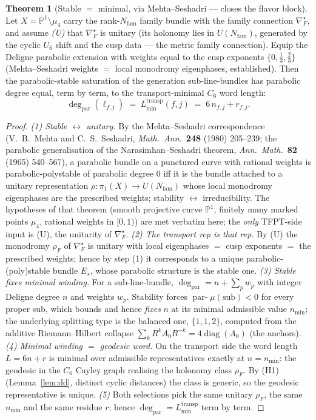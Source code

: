 \documentclass[11pt,a4paper]{article}
\newcommand{\Nfam}{N_{\mathrm{fam}}}
\theoremstyle{definition}
\newtheorem{theorem}{Theorem}
\begin{document}
\begin{theorem}[Stable $=$ minimal, via Mehta--Seshadri --- closes the flavor block]
\label{thm:ms}
Let $X=\mathbb P^1\setminus\mu_4$ carry the rank-$\Nfam$ family bundle with the family
connection $\nabla_F^\star$, and assume \emph{(U)} that $\nabla_F^\star$ is unitary (its holonomy lies in
$U(\Nfam)$, generated by the cyclic $U_6$ shift and the cusp data --- the metric family connection).
Equip the Deligne parabolic extension with weights equal to the cusp exponents
$\{0,\tfrac13,\tfrac23\}$ (Mehta--Seshadri weights $=$ local monodromy eigenphases, established).
Then the parabolic-stable saturation of the generation sub-line-bundles has parabolic degree equal,
term by term, to the transport-minimal $C_6$ word length:
\[
  \deg_{\mathrm{par}}(\ell_{f,j}) \;=\; L^{\mathrm{transp}}_{\min}(f,j)\;=\;6\,n_{f,j}+r_{f,j}.
\]
\end{theorem}
\begin{proof}
\emph{(1) Stable $\leftrightarrow$ unitary.} By the Mehta--Seshadri correspondence (V.~B.~Mehta and
C.~S.~Seshadri, \emph{Math.\ Ann.}\ \textbf{248} (1980) 205--239; the parabolic generalisation of the
Narasimhan--Seshadri theorem, \emph{Ann.\ Math.}\ \textbf{82} (1965) 540--567), a parabolic bundle on
a punctured curve with rational weights is parabolic-polystable of parabolic degree $0$ iff it is the
bundle attached to a unitary representation $\rho:\pi_1(X)\to U(\Nfam)$ whose local monodromy eigenphases
are the prescribed weights; stability $\leftrightarrow$ irreducibility. The hypotheses of that theorem
(smooth projective curve $\mathbb P^1$, finitely many marked points $\mu_4$, rational weights in $[0,1)$)
are met verbatim here; the \emph{only} TFPT-side input is (U), the unitarity of $\nabla_F^\star$.
\emph{(2) The transport rep is that rep.} By (U) the monodromy $\rho_F$ of $\nabla_F^\star$ is unitary
with local eigenphases $=$ cusp exponents $=$ the prescribed weights; hence by step (1) it corresponds to
a unique parabolic-(poly)stable bundle $E_\star$, whose parabolic structure is the stable one.
\emph{(3) Stable fixes minimal winding.} For a sub-line-bundle, $\deg_{\mathrm{par}}=n+\sum_p w_p$ with
integer Deligne degree $n$ and weights $w_p$. Stability forces $\operatorname{par-}\mu(\mathrm{sub})<0$
for every proper sub, which bounds and hence \emph{fixes} $n$ at its minimal admissible value $n_{\min}$;
the underlying splitting type is the balanced one, $\{1,1,2\}$, computed from the additive
Riemann--Hilbert collapse $\sum_k R^kA_0R^{-k}=4\operatorname{diag}(A_0)$ (the anchors).
\emph{(4) Minimal winding $=$ geodesic word.} On the transport side the word length $L=6n+r$ is minimal
over admissible representatives exactly at $n=n_{\min}$: the geodesic in the $C_6$ Cayley graph realising
the holonomy class $\rho_F$. By (H1) (Lemma~\ref{lem:dd}, distinct cyclic distances) the class is generic,
so the geodesic representative is unique.
\emph{(5)} Both selections pick the same unitary $\rho_F$, the same $n_{\min}$ and the same residue $r$;
hence $\deg_{\mathrm{par}}=L^{\mathrm{transp}}_{\min}$ term by term. \qedhere
\end{proof}
\end{document}

